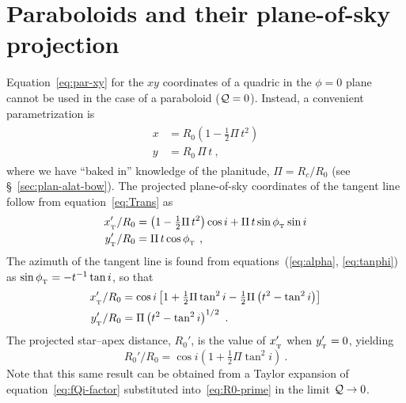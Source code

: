 \section{Paraboloids and their plane-of-sky projection}
\label{app:parabola}

Equation~\eqref{eq:par-xy} for the \(xy\) coordinates of a quadric in the \(\phi = 0\) plane cannot be used in the case of a paraboloid (\(\mathcal{Q} = 0\)).  Instead, a convenient parametrization is
\begin{gather}
  \label{eq:parabola-xy}
  \begin{aligned}
    x &= R_0 \left(1  - \tfrac{1}{2} \Pi\, t^2\right) \\
    y &= R_0\, \Pi\, t \ ,
  \end{aligned}
\end{gather}
where we have ``baked in'' knowledge of the planitude,
\(\Pi = R_c/R_0\) (see \S~\ref{sec:plan-alat-bow}). The projected
plane-of-sky coordinates of the tangent line follow from
equation~\eqref{eq:Trans} as
\begin{gather}
  \label{eq:parabola-xy-prime-phi}
  \begin{aligned}
    x_{_{\mathrm{\scriptscriptstyle T}}}' / R_0 &= \left(1 - \tfrac{1}{2} \Pi\, t^2\right) \cos i
      + \Pi\, t \sin\phi_{_{\mathrm{\scriptscriptstyle T}}} \sin i\\
    y_{_{\mathrm{\scriptscriptstyle T}}}' / R_0 &= \Pi\, t \cos\phi_{_{\mathrm{\scriptscriptstyle T}}}\ ,
  \end{aligned}
\end{gather}
The azimuth of the tangent line is found from
equations~(\ref{eq:alpha}, \ref{eq:tanphi}) as
\(\sin\phi_{_{\mathrm{\scriptscriptstyle T}}} = -t^{-1} \tan i \), so that
\begin{gather}
  \label{eq:parabola-xy-prime-final}
  \begin{aligned}
    x_{_{\mathrm{\scriptscriptstyle T}}}' / R_0 &= \cos i \left[ 1 + \tfrac{1}{2} \Pi \tan^2 i -
      \tfrac{1}{2} \Pi \left( t^2 - \tan^2 i \right) \right]\\
    y_{_{\mathrm{\scriptscriptstyle T}}}' / R_0 &= \Pi \left( t^2 - \tan^2 i \right)^{1/2} \ .
  \end{aligned}
\end{gather}
The projected star--apex distance, \(R_0'\), is the value of
\(x_{_{\mathrm{\scriptscriptstyle T}}}'\) when \(y_{_{\mathrm{\scriptscriptstyle T}}}' = 0\), yielding
\begin{equation}
  \label{eq:parabola-R0-prime}
  R_0' / R_0 = \cos i \left( 1 + \tfrac{1}{2} \Pi \tan^2 i  \right) \ . 
\end{equation}
Note that this same result can be obtained from a Taylor expansion of
equation~\eqref{eq:fQi-factor} substituted into~\eqref{eq:R0-prime} in
the limit \(\mathcal{Q} \to 0\).

